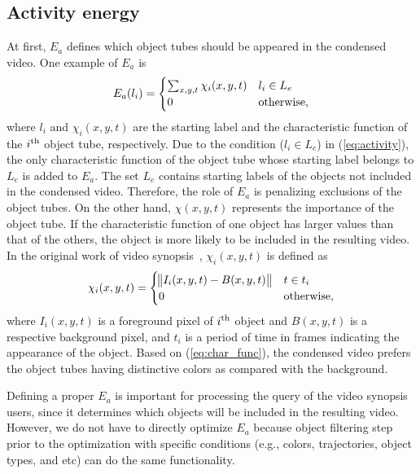 \documentclass[11pt]{hyu_thesis}
\begin{document}
\subsection{Activity energy}
At first, $E_a$ defines which object tubes should be appeared in the condensed video. One example of $E_a$ is
\begin{equation}
\label{eq:activity}
E_a(l_i) =
\begin{cases}
\sum_{x,y,t} \chi_i (x,y,t) & l_i \in L_e \\
0 & \rm{otherwise},
\end{cases}
\end{equation}
where $l_i$ and $\chi_i (x,y,t)$ are the starting label and the characteristic function of the $i^{\rm{th}}$ object tube, respectively. Due to the condition ($l_i \in L_e$) in (\ref{eq:activity}), the only characteristic function of the object tube whose starting label belongs to $L_e$ is added to $E_a$. The set $L_e$ contains starting labels of the objects not included in the condensed video. Therefore, the role of $E_a$ is penalizing exclusions of the object tubes. On the other hand, $\chi (x,y,t)$ represents the importance of the object tube. If the characteristic function of one object has larger values than that of the others, the object is more likely to be included in the resulting video. In the original work of video synopsis~\cite{Rav-Acha2006,Pritch2007,Pritch2008}, $\chi_i (x,y,t)$ is defined as
\begin{equation}
\label{eq:char_func}
\chi_i(x,y,t)=
\begin{cases}
\norm{I_i(x,y,t)-B(x,y,t)} & t \in t_i\\
0 & \rm{otherwise},
\end{cases}
\end{equation}
where $I_i(x,y,t)$ is a foreground pixel of $i^{\rm{th}}$ object and $B(x,y,t)$ is a respective background pixel, and $t_i$ is a period of time in frames indicating the appearance of the object. Based on (\ref{eq:char_func}), the condensed video prefers the object tubes having distinctive colors as compared with the background. 

Defining a proper $E_a$ is important for processing the query of the video synopsis users, since it determines which objects will be included in the resulting video. However, we do not have to directly optimize $E_a$ because object filtering step prior to the optimization with specific conditions (e.g., colors, trajectories, object types, and etc) can do the same functionality.
\end{document}
